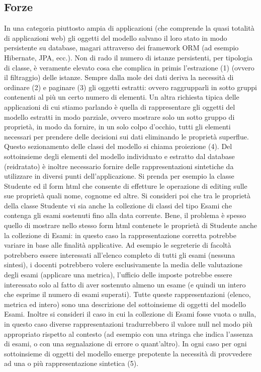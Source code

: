 \subsection{Forze}
In una categoria piuttosto ampia di applicazioni (che comprende la quasi totalità di applicazioni web)  gli oggetti del modello salvano il loro stato in modo persistente su database, magari attraverso dei framework ORM (ad esempio Hibernate, JPA, ecc.). Non di rado il numero di istanze persistenti, per tipologia di classe, è veramente elevato cosa che complica in primis l'estrazione (1) (ovvero il filtraggio) delle istanze. Sempre dalla mole dei dati deriva la necessità di ordinare (2) e paginare (3) gli oggetti estratti: ovvero raggrupparli in sotto gruppi contenenti al più un certo numero di elementi.
Un altra richiesta tipica delle applicazioni di cui stiamo parlando è quella di rappresentare gli oggetti del modello estratti in modo parziale, ovvero mostrare solo un sotto gruppo di proprietà, in modo da fornire, in un solo colpo d'occhio, tutti gli elementi necessari per prendere delle decisioni sui dati eliminando le proprietà superflue. Questo sezionamento delle classi del modello si chiama proiezione (4).
Del sottoinsieme degli elementi del modello individuato e estratto dal database (reidratato) è inoltre necessario fornire delle rappresentazioni sintetiche da utilizzare in diversi punti dell'applicazione. Si prenda per esempio la classe Studente ed  il form html che consente di effetture le operazione di editing sulle sue proprietà quali nome, cognome ed altre. Si consideri poi che tra le proprietà della classe Studente vi sia anche la collezione di classi del tipo Esami che contenga gli esami sostenuti fino alla data corrente. Bene, il problema è spesso quello di mostrare nello stesso form html contenete le proprietà di Studente anche la collezione di Esami: in questo caso la rappresentazione corretta potrebbe variare in base alle finalità applicative. Ad esempio le segreterie di facoltà potrebbero essere interessati all'elenco completo di tutti gli esami (nessuna sintesi), i docenti potrebbero volere esclusivamente la media delle valutazione degli esami (applicare una metrica), l'ufficio delle imposte potrebbe essere interessato solo al fatto di aver sostenuto almeno un esame (e quindi un intero che esprime il numero di esami superati). Tutte queste rappresentazioni (elenco, metrica ed intero) sono una descrizione del sottoinsieme di oggetti del modello Esami.
Inoltre si consideri il caso in cui la collezione di Esami fosse vuota o nulla, in questo caso diverse rappresentazioni tradurrebbero il valore null nel modo più appropriato rispetto al contesto (ad esempio con una stringa che indica l'assenza di esami, o con una segnalazione di errore o quant'altro).  In ogni caso per ogni sottoinsieme di oggetti del modello emerge prepotente la necessità di provvedere ad una o più rappresentazione sintetica (5).
